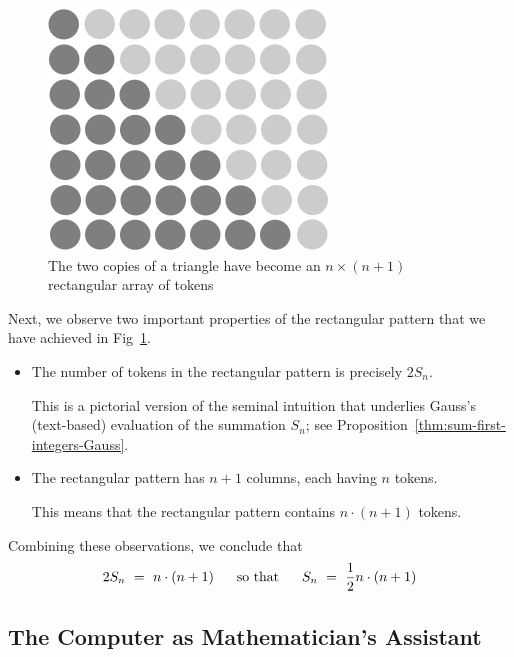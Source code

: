 \begin{figure}[ht]
\begin{center}
       \includegraphics[scale=0.35]{FiguresMaths/SumIntegersFinal}
\caption{The two copies of a triangle have become an $n \times (n+1)$ rectangular array of tokens}
       \label{fig:sumIntegers3}
\end{center}
\end{figure}
Next, we observe two important properties of the rectangular pattern that we have achieved in Fig~\ref{fig:sumIntegers3}.
\begin{itemize}
\item
The number of tokens in the rectangular pattern is precisely $2 S_n$.

\smallskip

This is a pictorial version of the seminal intuition that underlies Gauss's (text-based) evaluation of the summation $S_n$; see Proposition~\ref{thm:sum-first-integers-Gauss}.

\medskip\item
The rectangular pattern has $n+1$ columns, each having $n$ tokens.

\smallskip

This means that the rectangular pattern contains $n \cdot (n+1)$ tokens.
\end{itemize}
Combining these observations, we conclude that
\[ 2 S_n \ = \ n \cdot (n+1) \ \ \ \ \mbox{ so that } \ \ \ \
S_n \ = \ {1 \over 2} n \cdot (n+1)
\]


\subsection{The Computer as Mathematician's Assistant}

